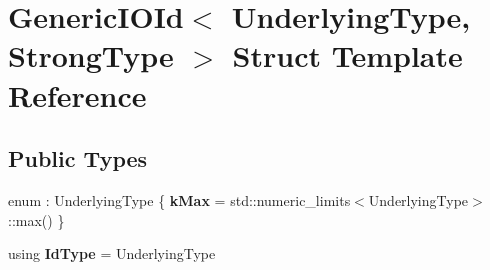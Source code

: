 \hypertarget{struct_generic_i_o_id}{}\section{Generic\+I\+O\+Id$<$ Underlying\+Type, Strong\+Type $>$ Struct Template Reference}
\label{struct_generic_i_o_id}
\subsection*{Public Types}
\begin{DoxyCompactItemize}
\item 
\mbox{\label{struct_generic_i_o_id_aba883ebeb5eb80be26c4e6e56a68b5ac}} 
enum \+: Underlying\+Type \{ {\bfseries k\+Max} = std\+::numeric\+\_\+limits$<$Underlying\+Type$>$\+::max()
 \}
\item 
\mbox{\label{struct_generic_i_o_id_a5c78430650327d50fc2b9d99330539bf}} 
using {\bfseries Id\+Type} = Underlying\+Type
\end{DoxyCompactItemize}
